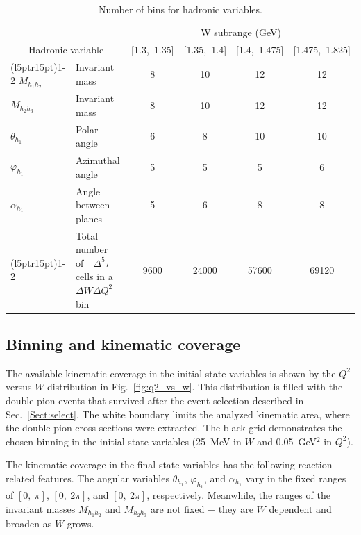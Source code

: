 \documentclass[prc,twocolumn,superscriptaddress,showpacs,amssymb,amsmath,amsfonts,aps,nofootinbib]{revtex4-1}
\begin{document}
\vspace{0.5em}
\begin{table}[htb]\normalsize
\centering 
  \caption{\small Number of bins for hadronic variables.} \label{tab:summary_bins}
  \begin{tabular}{lm{4cm}cccc}
    \toprule
    & & \multicolumn{4}{c}{W subrange (GeV)} \\
    \multicolumn{2}{c}{\centering Hadronic variable }  & [1.3,~1.35] & [1.35,~1.4] & [1.4,~1.475] & [1.475,~1.825] \\
    \cmidrule(l{5pt}r{15pt}){1-2} \cmidrule(l{5pt}r{5pt}){3-6}
    $M_{h_{1}h_{2}}$   & Invariant mass       &   8  & 10 & 12 & 12  \\
    $M_{h_{2}h_{3}}$   & Invariant mass       &   8  & 10 & 12 & 12  \\
    $\theta_{h_{1}}$   & Polar angle          &   6  & 8  & 10 & 10  \\
    $\varphi_{h_{1}}$  & Azimuthal angle      &   5  & 5  & 5  & 6   \\
    $\alpha_{h_{1}}$   & Angle between planes &   5  & 6  & 8  & 8   \\
    \cmidrule(l{5pt}r{15pt}){1-2} \cmidrule(l{5pt}r{5pt}){3-6}
              & Total~~$\!$number~~$\!$of~~$\!$$\Delta^{5}\tau$ \newline cells in a $\!$$\Delta W \Delta Q^2$ $\!$bin &   9600  & 24000  & 57600  & 69120   \\
    \bottomrule
  \end{tabular}
\end{table}
\vspace{0.5em}



\subsection{Binning and kinematic coverage}
\label{Sect:binning}



The available kinematic coverage in the initial state variables is shown by the $Q^2$ versus $W$ distribution in Fig.\!~\ref{fig:q2_vs_w}. This distribution is filled with the double-pion events that survived after the event selection described in Sec.\!~\ref{Sect:select}. The white boundary limits the analyzed kinematic area, where the double-pion cross sections were extracted. The black grid demonstrates the chosen binning in the initial state variables (25~MeV in $W$ and 0.05~GeV$^{2}$ in $Q^{2}$).


The kinematic coverage in the final state variables has the following reaction-related features. The angular variables $\theta_{h_{1}}$, $\varphi_{h_{1}}$, and $\alpha_{h_{1}}$ vary in the fixed ranges of $[0,~\pi]$, $[0,~2\pi]$, and $[0,~2\pi]$, respectively. Meanwhile, the ranges of the invariant masses $M_{h_{1}h_{2}}$ and $M_{h_{2}h_{3}}$ are not fixed $-$ they are $W$ dependent and broaden as $W$ grows. 
\end{document}
